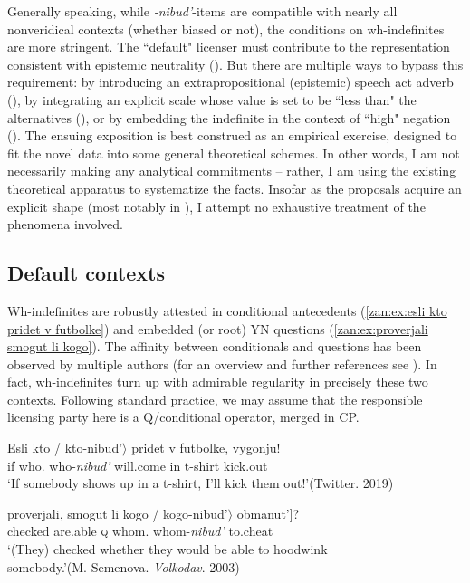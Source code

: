 \documentclass[output=paper,colorlinks,citecolor=brown]{langscibook}
\begin{document}
Generally speaking, while \textit{-nibud'}-items are compatible with nearly all nonveridical contexts (whether biased or not), the conditions on wh-indefinites are more stringent. The ``default" licenser must contribute to the representation consistent with epistemic neutrality (). But there are multiple ways to bypass this requirement: by introducing an extrapropositional (epistemic) speech act adverb (), by integrating an explicit scale whose value is set to be ``less than" the alternatives (), or by embedding the indefinite in the context of ``high" negation (). The ensuing exposition is best construed as an empirical exercise, designed to fit the novel data into some general theoretical schemes. In other words, I am not necessarily making any analytical commitments -- rather, I am using the existing theoretical apparatus to systematize the facts. Insofar as the proposals acquire an explicit shape (most notably in ), I attempt no exhaustive treatment of the phenomena involved.                   

\subsection{Default contexts}\label{zan:subsec:default context}
Wh-indefinites are robustly attested in conditional antecedents (\ref{zan:ex:esli kto pridet v futbolke}) and embedded (or root) YN questions (\ref{zan:ex:proverjali smogut li kogo}). The affinity between conditionals and questions has been observed by multiple authors (for an overview and further references see \citealt{bhatt2017conditionals}). In fact, wh-indefinites turn up with admirable regularity in precisely these two contexts. Following standard practice, we may assume that the responsible licensing party here is a Q/conditional operator, merged in CP.


\ea
\ea \label{zan:ex:esli kto pridet v futbolke}
\gll Esli	kto / \minsp{$\langle$} kto-nibud'$\rangle$ 	 pridet v futbolke, vygonju!\\
if	who.{\INDF} {} {} who-\textit{nibud'} will.come in t-shirt kick.out\\
\glt  `If somebody shows up in a t-shirt, I'll kick them out!'\hfill (Twitter. 2019)

\ex \label{zan:ex:proverjali smogut li kogo}
\gll \minsp{\dots} proverjali, \minsp{[} smogut li kogo / \minsp{$\langle$} kogo-nibud'$\rangle$ obmanut']?\\
{} checked {} are.able \textsc{q} whom.{\INDF} {} {} whom-\textit{nibud'} to.cheat\\
\glt  `(They) checked whether they would be able to hoodwink \\somebody.'\hfill (M. Semenova. \textit{Volkodav}. 2003)
\z\z
\end{document}
